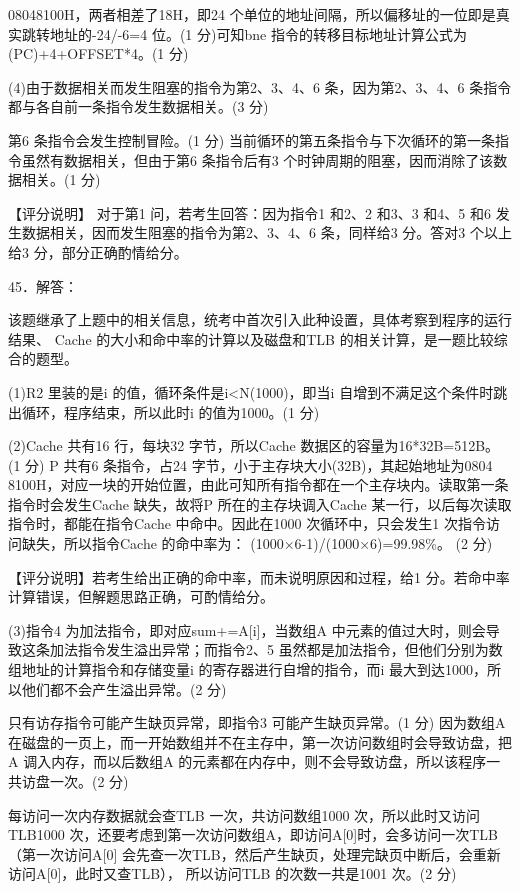 \documentclass[UTF8,11pt]{ctexart}
\begin{document}
08048100H，两者相差了18H，即24 个单位的地址间隔，所以偏移址的一位即是真实跳转地址的-24/-6=4 位。(1 分)可知bne 指令的转移目标地址计算公式为(PC)+4+OFFSET*4。(1 分)


(4)由于数据相关而发生阻塞的指令为第2、3、4、6 条，因为第2、3、4、6 条指令都与各自前一条指令发生数据相关。(3 分)


第6 条指令会发生控制冒险。(1 分) 当前循环的第五条指令与下次循环的第一条指令虽然有数据相关，但由于第6 条指令后有3 个时钟周期的阻塞，因而消除了该数据相关。(1 分)


【评分说明】 对于第1 问，若考生回答：因为指令1 和2、2 和3、3 和4、5 和6 发生数据相关，因而发生阻塞的指令为第2、3、4、6 条，同样给3 分。答对3 个以上给3 分，部分正确酌情给分。


45．解答：


该题继承了上题中的相关信息，统考中首次引入此种设置，具体考察到程序的运行结果、 Cache 的大小和命中率的计算以及磁盘和TLB 的相关计算，是一题比较综合的题型。


(1)R2 里装的是i 的值，循环条件是i<N(1000)，即当i 自增到不满足这个条件时跳出循环，程序结束，所以此时i 的值为1000。(1 分)


(2)Cache 共有16 行，每块32 字节，所以Cache 数据区的容量为16*32B=512B。 (1 分) P 共有6 条指令，占24 字节，小于主存块大小(32B)，其起始地址为0804 8100H，对应一块的开始位置，由此可知所有指令都在一个主存块内。读取第一条指令时会发生Cache 缺失，故将P 所在的主存块调入Cache 某一行，以后每次读取指令时，都能在指令Cache 中命中。因此在1000 次循环中，只会发生1 次指令访问缺失，所以指令Cache 的命中率为： (1000×6-1)/(1000×6)=99.98\%。 (2 分)


【评分说明】若考生给出正确的命中率，而未说明原因和过程，给1 分。若命中率计算错误，但解题思路正确，可酌情给分。


(3)指令4 为加法指令，即对应sum+=A[i]，当数组A 中元素的值过大时，则会导致这条加法指令发生溢出异常；而指令2、5 虽然都是加法指令，但他们分别为数组地址的计算指令和存储变量i 的寄存器进行自增的指令，而i 最大到达1000，所以他们都不会产生溢出异常。(2 分)


只有访存指令可能产生缺页异常，即指令3 可能产生缺页异常。(1 分) 因为数组A 在磁盘的一页上，而一开始数组并不在主存中，第一次访问数组时会导致访盘，把A 调入内存，而以后数组A 的元素都在内存中，则不会导致访盘，所以该程序一共访盘一次。(2 分)


每访问一次内存数据就会查TLB 一次，共访问数组1000 次，所以此时又访问TLB1000 次，还要考虑到第一次访问数组A，即访问A[0]时，会多访问一次TLB（第一次访问A[0] 会先查一次TLB，然后产生缺页，处理完缺页中断后，会重新访问A[0]，此时又查TLB）， 所以访问TLB 的次数一共是1001 次。(2 分)
\end{document}

